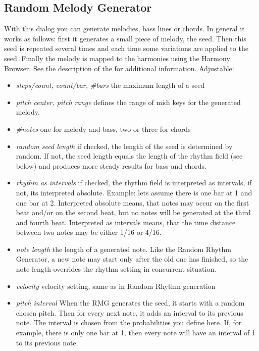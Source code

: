 \documentclass[letterpaper]{report}
\begin{document}
\subsection{Random Melody Generator}\label{shuffle}

With this dialog you can generate melodies, bass lines or chords.
In general it works as follows: first it generates a small piece of melody,
the seed. Then this seed is repeated several times and each time some variations are
applied to the seed. Finally the melody is mapped to the harmonies using the Harmony
Browser. See the description of the 
for additional information. Adjustable:

\begin{itemize}

\item {\em steps/count, count/bar, \#bars} the maximum length of a seed

\item{\em pitch center, pitch range} defines the range of midi keys for the
generated melody.

\item{\em \#notes} one for melody and bass, two or three for chords

\item{\em random seed length} if checked, the length of the seed is
determined by random. If not, the seed length equals the length of
the rhythm field (see below) and produces more steady results for bass
and chords.

\item{\em rhythm as intervals} if checked, the rhythm field is interpreted as
intervals, if not, its interpreted absolute. Example: lets assume there is one bar
at 1 and one bar at 2. Interpreted absolute means, that notes may occur on the first
beat and/or on the second beat, but no notes will be generated at the third and fourth
beat. Interpreted as intervals means, that the time distance between two notes
may be either 1/16 or 4/16.

\item{\em note length} the length of a generated note. Like the Random Rhythm
Generator, a new note may start only after the old one has finished, so the
note length overrides the rhythm setting in concurrent situation.

\item{\em velocity} velocity setting, same as in Random Rhythm generation

\item{\em pitch interval} When the RMG generates the seed, it starts with a random
chosen pitch. Then for every next note, it adds an interval to its previous
note.
The interval is chosen from the probabilities you define here. If, for example,
there
is only one bar at 1, then every note will have an interval of 1 to its previous
note.


\end{itemize}
\end{document}
